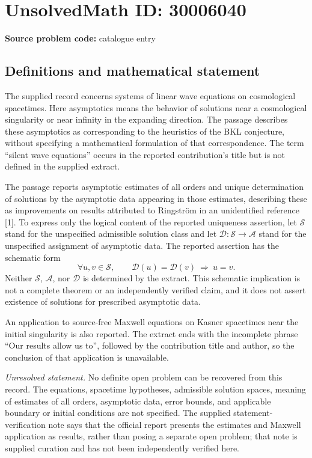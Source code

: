\documentclass[11pt]{article}
\begin{document}
\section*{UnsolvedMath ID: 30006040}
\textbf{Source problem code:} catalogue entry
\subsection{Definitions and mathematical statement}
The supplied record concerns systems of linear wave equations on cosmological spacetimes. Here asymptotics means the behavior of solutions near a cosmological singularity or near infinity in the expanding direction. The passage describes these asymptotics as corresponding to the heuristics of the BKL conjecture, without specifying a mathematical formulation of that correspondence. The term ``silent wave equations'' occurs in the reported contribution's title but is not defined in the supplied extract.

The passage reports asymptotic estimates of all orders and unique determination of solutions by the asymptotic data appearing in those estimates, describing these as improvements on results attributed to Ringstr\"om in an unidentified reference [1]. To express only the logical content of the reported uniqueness assertion, let \(\mathcal S\) stand for the unspecified admissible solution class and let \(\mathcal D:\mathcal S\to\mathcal A\) stand for the unspecified assignment of asymptotic data. The reported assertion has the schematic form
\[
\forall u,v\in\mathcal S,\qquad
\mathcal D(u)=\mathcal D(v)\ \Longrightarrow\ u=v.
\]
Neither \(\mathcal S\), \(\mathcal A\), nor \(\mathcal D\) is determined by the extract. This schematic implication is not a complete theorem or an independently verified claim, and it does not assert existence of solutions for prescribed asymptotic data.

An application to source-free Maxwell equations on Kasner spacetimes near the initial singularity is also reported. The extract ends with the incomplete phrase ``Our results allow us to'', followed by the contribution title and author, so the conclusion of that application is unavailable.

\emph{Unresolved statement.} No definite open problem can be recovered from this record. The equations, spacetime hypotheses, admissible solution spaces, meaning of estimates of all orders, asymptotic data, error bounds, and applicable boundary or initial conditions are not specified. The supplied statement-verification note says that the official report presents the estimates and Maxwell application as results, rather than posing a separate open problem; that note is supplied curation and has not been independently verified here.
\end{document}
